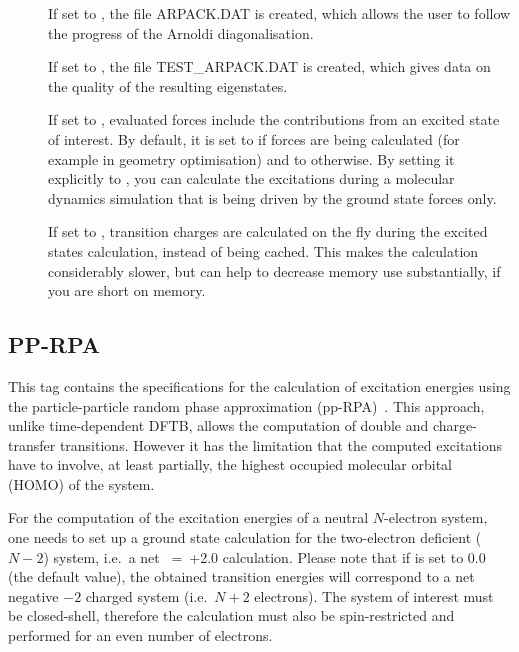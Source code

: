 \begin{description}
  \item[] If set to , the file ARPACK.DAT is
    created, which allows the user to follow the progress of the Arnoldi
    diagonalisation.

  \item[] If set to , the file TEST\_ARPACK.DAT is
    created, which gives data on the quality of the resulting eigenstates.

  \item[] If set to , evaluated forces include
    the contributions from an excited state of interest. By default, it is set
    to  if forces are being calculated (for example in geometry
    optimisation) and to  otherwise. By setting it explicitly to ,
    you can calculate the excitations during a molecular dynamics simulation
    that is being driven by the ground state forces only.

  \item[] If set to , transition charges are calculated
    on the fly during the excited states calculation, instead of being
    cached. This makes the calculation considerably slower, but can help to
    decrease memory use substantially, if you are short on memory.

  \end{description}
  
\subsection{PP-RPA}
\label{sec:dftbp.pprpa}

This tag contains the specifications for the calculation of excitation energies
using the particle-particle random phase approximation
(pp-RPA)~\cite{Yang2017}. This approach, unlike time-dependent DFTB, allows the
computation of double and charge-transfer transitions. However it has the
limitation that the computed excitations have to involve, at least partially,
the highest occupied molecular orbital (HOMO) of the system.

For the computation of the excitation energies of a neutral $N$-electron system,
one needs to set up a ground state calculation for the two-electron deficient
($N-2$) system, i.e.\ a net \mbox{ = +2.0} calculation. Please note
that if  is set to 0.0 (the default value), the obtained transition
energies will correspond to a net negative $-2$ charged system (i.e.\ $N+2$
electrons). The system of interest must be closed-shell, therefore the
calculation must also be spin-restricted and performed for an even number of
electrons.

